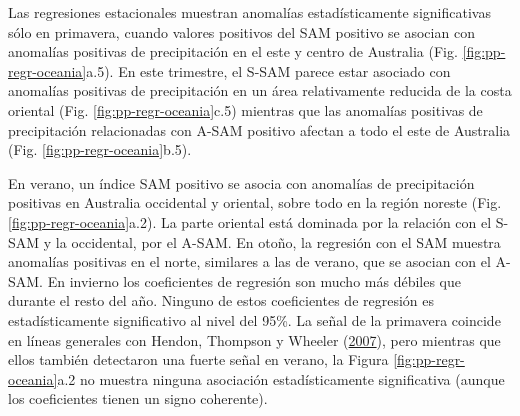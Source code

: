 \documentclass[12pt,oneside,a4paper]{reedthesis}
\begin{document}
Las regresiones estacionales muestran anomalías estadísticamente significativas sólo en primavera, cuando valores positivos del SAM positivo se asocian con anomalías positivas de precipitación en el este y centro de Australia (Fig. \ref{fig:pp-regr-oceania}a.5).
En este trimestre, el S-SAM parece estar asociado con anomalías positivas de precipitación en un área relativamente reducida de la costa oriental (Fig. \ref{fig:pp-regr-oceania}c.5) mientras que las anomalías positivas de precipitación relacionadas con A-SAM positivo afectan a todo el este de Australia (Fig. \ref{fig:pp-regr-oceania}b.5).

En verano, un índice SAM positivo se asocia con anomalías de precipitación positivas en Australia occidental y oriental, sobre todo en la región noreste (Fig. \ref{fig:pp-regr-oceania}a.2).
La parte oriental está dominada por la relación con el S-SAM y la occidental, por el A-SAM.
En otoño, la regresión con el SAM muestra anomalías positivas en el norte, similares a las de verano, que se asocian con el A-SAM.
En invierno los coeficientes de regresión son mucho más débiles que durante el resto del año.
Ninguno de estos coeficientes de regresión es estadísticamente significativo al nivel del 95\%.
La señal de la primavera coincide en líneas generales con Hendon, Thompson y Wheeler (\protect\hyperlink{ref-hendon2007}{2007}), pero mientras que ellos también detectaron una fuerte señal en verano, la Figura \ref{fig:pp-regr-oceania}a.2 no muestra ninguna asociación estadísticamente significativa (aunque los coeficientes tienen un signo coherente).
\end{document}
